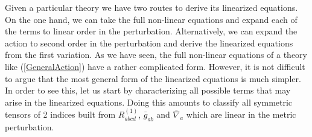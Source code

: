 \documentclass[11pt]{article}
\begin{document}
Given a particular theory we have two routes to derive its linearized equations. On the one hand, we can  take the full non-linear equations and expand each of the terms to linear order in the perturbation. Alternatively, we can expand the action to second order in the perturbation and derive the linearized equations from the first variation. 
As we have seen, the full non-linear equations of a theory like  (\ref{GeneralAction}) have a rather complicated form. However, it is not difficult to argue that the most general form of the linearized equations is much simpler. In order to see this, let us start by characterizing all possible terms that may arise in the linearized equations. Doing this amounts to classify all symmetric tensors of 2 indices built from $R_{abcd}^{(1)}$, $\bar g_{ab}$ and $\bar \nabla_a$ which are linear in the metric perturbation. 
\end{document}
